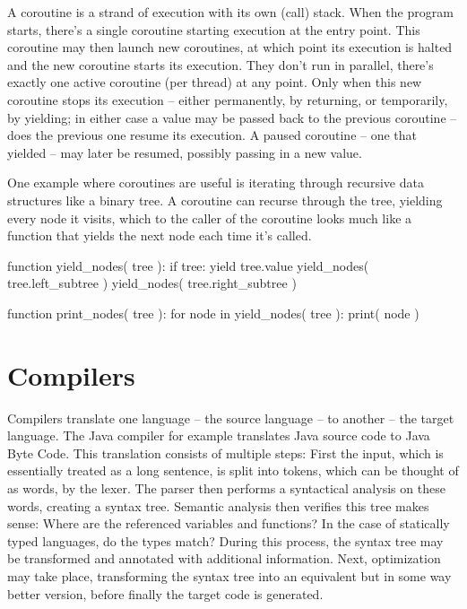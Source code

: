 		A coroutine is a strand of execution with its own (call) stack. When the program starts, there's a single coroutine starting execution at the entry point. This coroutine may then launch new coroutines, at which point its execution is halted and the new coroutine starts its execution. They don't run in parallel, there's exactly one active coroutine (per thread) at any point. Only when this new coroutine stops its execution -- either permanently, by returning, or temporarily, by yielding; in either case a value may be passed back to the previous coroutine -- does the previous one resume its execution. A paused coroutine -- one that yielded -- may later be resumed, possibly passing in a new value.
		
		One example where coroutines are useful is iterating through recursive data structures like a binary tree. A coroutine can recurse through the tree, yielding every node it visits, which to the caller of the coroutine looks much like a function that yields the next node each time it's called.
		
		\begin{codelisting}[caption={Pseudocode of tree iteration using coroutines},morekeywords={function,if,for,in}]
function yield_nodes( tree ):
    if tree:
        yield tree.value
        yield_nodes( tree.left_subtree )
        yield_nodes( tree.right_subtree )

function print_nodes( tree ):
    for node in yield_nodes( tree ):
        print( node )
		\end{codelisting}
	
	\section{Compilers}
	
	
		Compilers translate one language -- the source language -- to another -- the target language. The Java compiler for example translates Java source code to Java Byte Code. This translation consists of multiple steps: First the input, which is essentially treated as a long sentence, is split into tokens, which can be thought of as words, by the lexer. The parser then performs a syntactical analysis on these words, creating a syntax tree. Semantic analysis then verifies this tree makes sense: Where are the referenced variables and functions? In the case of statically typed languages, do the types match? During this process, the syntax tree may be transformed and annotated with additional information. Next, optimization may take place, transforming the syntax tree into an equivalent but in some way better version, before finally the target code is generated.

